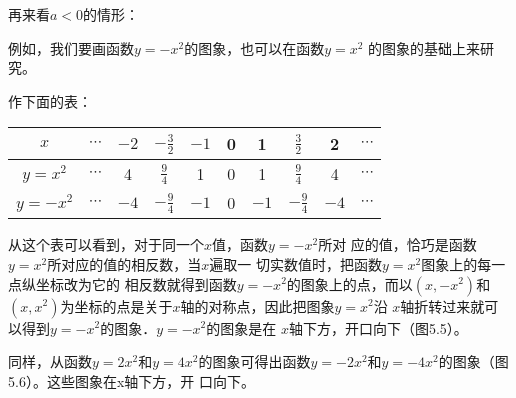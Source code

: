 再来看$a<0$的情形：

例如，我们要画函数$y=-x^2$的图象，也可以在函数$y=x^2$
的图象的基础上来研究。

作下面的表：
\begin{center}
\begin{tabular}{c|ccccccccc}
    \hline
$x$ &$\cdots$ & $-2$  & $-\frac{3}{2}$  & $-1$   & 0   & 1&$\frac{3}{2}$& 2&$\cdots$\\
\hline
$y=x^2$ &$\cdots$ & 4&$\frac{9}{4}$&1  & 0   & 1&$\frac{9}{4}$&4&$\cdots$\\
$y=-x^2$ &$\cdots$ & $-4$&$-\frac{9}{4}$&$-1$  & 0   & $-1$&$-\frac{9}{4}$&$-4$&$\cdots$\\
\hline
\end{tabular}    
\end{center}

从这个表可以看到，对于同一个$x$值，函数$y=-x^2$所对
应的值，恰巧是函数$y=x^2$所对应的值的相反数，当$x$遍取一
切实数值时，把函数$y=x^2$图象上的每一点纵坐标改为它的
相反数就得到函数$y=-x^2$的图象上的点，而以$(x,-x^2)$和
$(x,x^2)$为坐标的点是关于$x$轴的对称点，因此把图象$y=x^2$沿
$x$轴折转过来就可以得到$y=-x^2$的图象．$y=-x^2$的图象是在
$x$轴下方，开口向下（图5.5）。

同样，从函数$y=2x^2$和$y=4x^2$的图象可得出函数$y=
-2x^2$和$y=-4x^2$的图象（图5.6）。这些图象在x轴下方，开
口向下。

